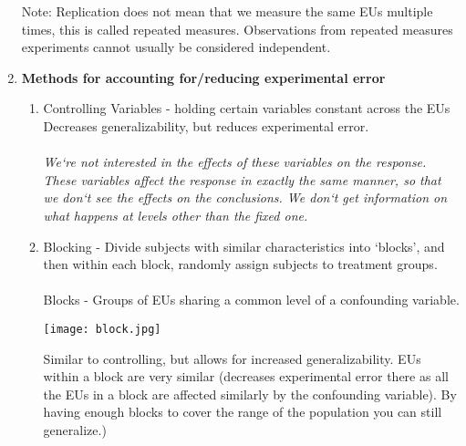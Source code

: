 \documentclass[]{book}
\begin{document}
\begin{enumerate}
\begin{enumerate}
            \end{enumerate}
Note: Replication does not mean that we measure the same EUs multiple times, this is called repeated measures.  Observations from repeated measures experiments cannot  usually be considered independent.
\newpage
        \item \textbf{Methods for accounting for/reducing experimental error}
        \begin{enumerate}
            \item Controlling Variables - holding certain variables constant across the EUs\\
            Decreases generalizability, but reduces experimental error.\\~\\
\noindent\textit{We`re not interested in the effects of these variables on the response.  These variables affect the response in exactly the same manner, so that we    don`t see the effects on the conclusions. We don`t get information on what happens at levels other than the fixed one.}
        \item Blocking - Divide subjects with similar characteristics into `blocks', and then within each block, randomly assign subjects to treatment groups.\\~\\
            Blocks - Groups of EUs sharing a common level of a confounding variable.\\
\begin{center}
\texttt{[image: block.jpg]}
\end{center}
            Similar to controlling, but allows for increased generalizability.  EUs within a block are very similar (decreases experimental error there as all the EUs in a block are affected similarly by the confounding variable).  By having enough blocks to cover the range of the population you can still generalize.)
        \end{enumerate}
    \end{enumerate}
\end{document}

